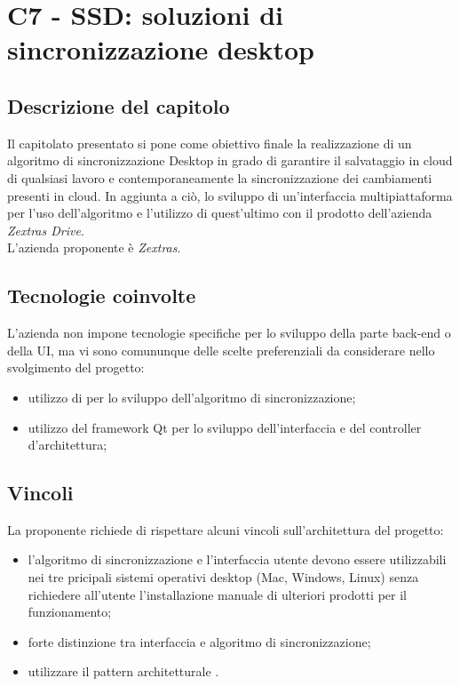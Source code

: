 \section{C7 - SSD: soluzioni di sincronizzazione desktop}

\subsection{Descrizione del capitolo}
Il capitolato presentato si pone come obiettivo finale la realizzazione di un algoritmo di sincronizzazione Desktop in grado di garantire il salvataggio in cloud di qualsiasi lavoro e contemporaneamente la sincronizzazione dei cambiamenti presenti in cloud. In aggiunta a ciò, lo sviluppo di un'interfaccia multipiattaforma per l'uso dell'algoritmo e l'utilizzo di quest'ultimo con il prodotto dell'azienda \textit{Zextras Drive}.\\
L'azienda proponente è \textit{Zextras}.

\subsection{Tecnologie coinvolte}
L'azienda non impone tecnologie specifiche per lo sviluppo della parte back-end o della UI, ma vi sono comununque delle scelte preferenziali da considerare nello svolgimento del progetto:
\begin{itemize}
\item utilizzo di  per lo sviluppo dell'algoritmo di sincronizzazione;
\item utilizzo del framework Qt per lo sviluppo dell'interfaccia e del controller d'architettura;
\end{itemize}

\subsection{Vincoli}
La proponente richiede di rispettare alcuni vincoli sull'architettura del progetto: 
\begin{itemize}
\item l’algoritmo di sincronizzazione e l’interfaccia utente devono essere utilizzabili nei tre pricipali sistemi operativi desktop (Mac, Windows, Linux) senza richiedere all’utente l’installazione manuale di ulteriori prodotti per il funzionamento; 
\item forte distinzione tra interfaccia e algoritmo di sincronizzazione; 
\item utilizzare il pattern architetturale .
\end{itemize}

